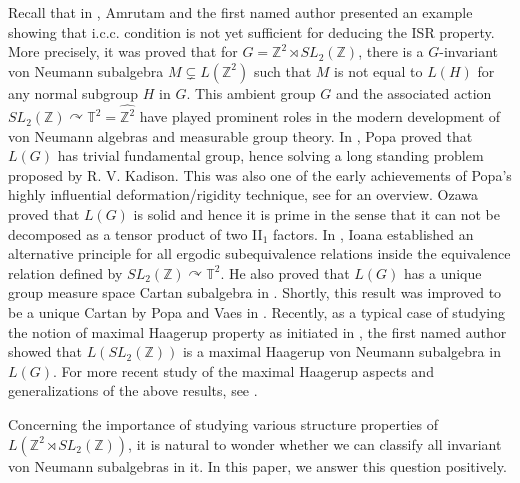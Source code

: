 \documentclass[12pt]{amsart}
\theoremstyle{definition}
\theoremstyle{remark}
\begin{document}
Recall that in \cite[Example 3.5]{aj}, Amrutam and the first named author presented an example showing that i.c.c. condition is not yet sufficient for deducing the ISR property. More precisely, it was proved that for $G=\mathbb{Z}^2\rtimes SL_2(\mathbb{Z})$, there is a $G$-invariant von Neumann subalgebra $M\subsetneq L(\mathbb{Z}^2)$ such that $M$ is not equal to $L(H)$ for any normal subgroup $H$ in $G$. This ambient group $G$ and the associated action $SL_2(\mathbb{Z})\curvearrowright \mathbb{T}^2=\widehat{\mathbb{Z}^2}$ have played prominent roles in the modern development of von Neumann algebras and measurable group theory. In \cite{popa_betti}, Popa proved that $L(G)$ has trivial fundamental group, hence solving a long standing problem proposed by R. V. Kadison. This was also one of the early achievements of Popa's highly influential deformation/rigidity technique, see \cites{popa_icm, ioana_icm, vaes_icm} for an overview. Ozawa proved that $L(G)$ is solid \cite{ozawa_hokkaido} and hence it is prime in the sense that it can not be decomposed as a tensor product of two II$_1$ factors. In \cite{ioana_subequivalence}, Ioana established an alternative principle for all ergodic subequivalence relations inside the equivalence relation defined by $SL_2(\mathbb{Z})\curvearrowright \mathbb{T}^2$. He also  
proved that $L(G)$ has a unique group measure space Cartan subalgebra in \cite{ioana_gafa}. Shortly, this result was improved to be a unique Cartan by Popa and Vaes in \cite{pv_crelle}.  Recently, as a typical case of studying the notion of maximal Haagerup property as initiated in \cite{jiangskalski}, the first named author showed that $L(SL_2(\mathbb{Z}))$ is a maximal Haagerup von Neumann subalgebra in $L(G)$. For more recent study of the maximal Haagerup aspects and generalizations of the above results, see \cites{val, jv}.








Concerning the importance of studying various structure properties of $L(\mathbb{Z}^2\rtimes SL_2(\mathbb{Z}))$, it is natural to wonder whether we can classify all invariant von Neumann subalgebras in it. In this paper, we answer this question positively.
\end{document}
